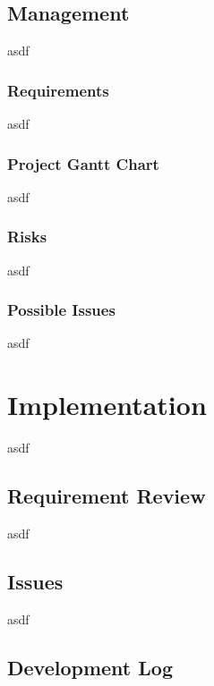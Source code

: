 \documentclass[12pt]{article}
\begin{document}
\subsection{Management}

asdf

\subsubsection{Requirements}

asdf

\subsubsection{Project Gantt Chart}

asdf

\subsubsection{Risks}

asdf

\subsubsection{Possible Issues}

asdf

















\section{Implementation}

asdf

\subsection{Requirement Review}

asdf

\subsection{Issues}

asdf

\subsection{Development Log}
\end{document}
